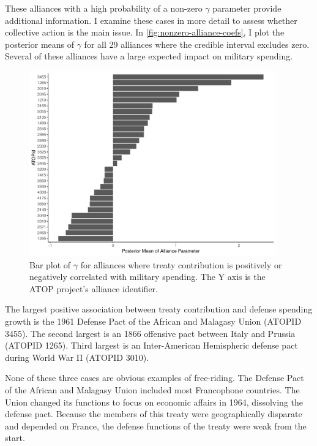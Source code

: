 \documentclass[12pt]{article}
\begin{document}
These alliances with a high probability of a non-zero $\gamma$ parameter provide additional information. 
I examine these cases in more detail to assess whether collective action is the main issue. 
In \autoref{fig:nonzero-alliance-coefs}, I plot the posterior means of $\gamma$ for all 29 alliances where the credible interval excludes zero.  
Several of these alliances have a large expected impact on military spending. 


\begin{figure}
	\centering
		\includegraphics[width=0.95\textwidth]{nonzero-alliance-coefs.pdf}
	\caption{Bar plot of $\gamma$ for alliances where treaty contribution is positively or negatively correlated with military spending. The Y axis is the ATOP project's alliance identifier.}	
	\label{fig:nonzero-alliance-coefs}
\end{figure}

 
The largest positive association between treaty contribution and defense spending growth is the 1961 Defense Pact of the African and Malagasy Union (ATOPID 3455). 
The second largest is an 1866 offensive pact between Italy and Prussia (ATOPID 1265). 
Third largest is an Inter-American Hemispheric defense pact during World War II (ATOPID 3010). 


None of these three cases are obvious examples of free-riding. 
The Defense Pact of the African and Malagasy Union included most Francophone countries. 
The Union changed its functions to focus on economic affairs in 1964, dissolving the defense pact. 
Because the members of this treaty were geographically disparate and depended on France, the defense functions of the treaty were weak from the start. 
\end{document}
